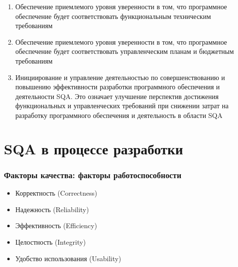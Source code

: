 \documentclass{../industrial-development}
\begin{document}
 	 \begin{enumerate}
\item Обеспечение приемлемого уровня уверенности в том, что программное обеспечение будет соответствовать функциональным техническим требованиям
\item Обеспечение приемлемого уровня уверенности в том, что программное обеспечение будет соответствовать управленческим планам и бюджетным требованиям
\item Инициирование и управление деятельностью по совершенствованию и повышению эффективности разработки программного обеспечения и деятельности SQA. Это означает улучшение перспектив достижения функциональных и управленческих требований при снижении затрат на разработку программного обеспечения и деятельность в области SQA~\cite[с.~29]{SQA-Galin}
  	\end{enumerate}


\section{SQA в процессе разработки}
\begin{frame} \frametitle{Факторы качества: факторы работоспособности}
 	 \begin{itemize}
\item Корректность (Correctness)
\item Надежность (Reliability)
\item Эффективность (Efficiency)
\item Целостность (Integrity)
\item Удобство использования (Usability)
  	\end{itemize}
\end{frame}

\lecturenotes
\end{document}
